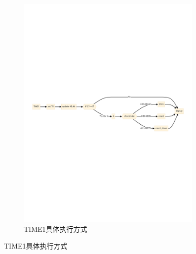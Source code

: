 \documentclass{article}
\begin{document}
\begin{figure}[H]
\begin{subfigure}{0.69\textwidth}
        \includegraphics[width=0.99\textwidth]{assets/time1.pdf}
        \caption{TIME1具体执行方式} 
    \end{subfigure}
\end{figure}
\end{document}
